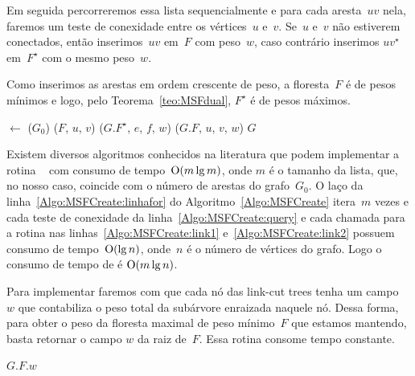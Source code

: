 Em seguida percorreremos essa lista sequencialmente e para cada aresta~$uv$ nela, faremos um teste de conexidade entre os vértices~$u$ e~$v$.
Se~$u$ e~$v$ não estiverem conectados, então inserimos~$uv$ em~$F$ com peso~$w$, caso contrário inserimos $uv^\star$ em~$F^\star$ com o mesmo peso~$w$.

Como inserimos as arestas em ordem crescente de peso, a floresta~$F$ é de pesos mínimos e logo, pelo Teorema~\ref{teo:MSFdual}, $F^\star$ é de pesos máximos.

\begin{algorithm}[htb]
\caption{\MSFCreate($n$, $G_0$)}
\label{Algo:MSFCreate}
\begin{algorithmic}[1]
\State {} $\gets$ \order($G_0$)
\label{Algo:MSFCreate:linhafor}
\If \linkcutQuery($F$, $u$, $v$)\label{Algo:MSFCreate:query}
\State \linkcutAddEdge($G$.$F^\star$, $e$, $f$, $w$)\label{Algo:MSFCreate:link1}
\Else
\State \linkcutAddEdge($G$.$F$, $u$, $v$, $w$)\label{Algo:MSFCreate:link2}
\EndIf
\EndFor
\State \Return $G$
\end{algorithmic}
\end{algorithm}

Existem diversos algoritmos conhecidos na literatura que podem implementar a rotina \order{}~\cite{CLRS} com consumo de tempo~$\mathrm{O}(m\lg m)$, onde $m$ é o tamanho da lista,
que, no nosso caso, coincide com o número de arestas do grafo~$G_0$.
O laço da linha~\ref{Algo:MSFCreate:linhafor} do Algoritmo~\ref{Algo:MSFCreate} itera~$m$ vezes e cada teste de conexidade da linha~\ref{Algo:MSFCreate:query} e cada chamada para a rotina  \linkcutAddEdge{} nas linhas~\ref{Algo:MSFCreate:link1} e~\ref{Algo:MSFCreate:link2} possuem consumo de tempo~$\mathrm{O}(\lg n)$, onde~$n$ é o número de vértices do grafo.
Logo o consumo de tempo de \MSFCreate{} é $\mathrm{O}(m\lg n)$.

Para implementar \MSFweight{} faremos com que cada nó das link-cut trees tenha um campo~$w$ que contabiliza o peso total da subárvore enraizada naquele nó.
Dessa forma, para obter o peso da floresta maximal de peso mínimo~$F$ que estamos mantendo, basta retornar o campo $w$ da raiz de~$F$.
Essa rotina consome tempo constante.

\begin{algorithm}[htb]
\caption{\MSFweight($G$)}
\label{Algo:MSFweight}
\begin{algorithmic}[1]
\State \Return $G$.$F$.$w$
\end{algorithmic}
\end{algorithm}

